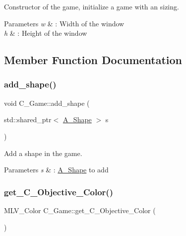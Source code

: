 Constructor of the game, initialize a game with an sizing. 


\begin{DoxyParams}{Parameters}
{\em w} & \+: Width of the window \\
\hline
{\em h} & \+: Height of the window \\
\hline
\end{DoxyParams}


\subsection{Member Function Documentation}
\mbox{\label{classGame_aab43fea0e202c203d998ae575d3f6eeb}} 
\subsubsection{\texorpdfstring{add\+\_\+shape()}{add\_shape()}}
{\footnotesize\ttfamily void C_Game\+::add\+\_\+shape (\begin{DoxyParamCaption}\item[{std\+::shared\+\_\+ptr$<$ \hyperlink{classShape}{A_Shape} $>$}]{s }\end{DoxyParamCaption})}



Add a shape in the game. 


\begin{DoxyParams}{Parameters}
{\em s} & \+: \hyperlink{classShape}{A_Shape} to add \\
\hline
\end{DoxyParams}
\mbox{\label{classGame_ac5de4b11ae90a7ea9182621039fa511c}} 
\subsubsection{\texorpdfstring{get\+\_\+\+C_Objective\+\_\+\+Color()}{get\_Objective\_Color()}}
{\footnotesize\ttfamily M\+L\+V\+\_\+\+Color C_Game\+::get\+\_\+\+C_Objective\+\_\+\+Color (\begin{DoxyParamCaption}{ }\end{DoxyParamCaption})}



